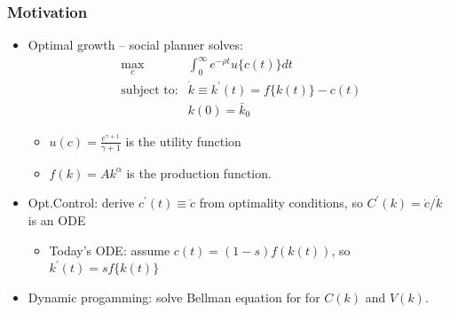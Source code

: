 \documentclass[bigger,handout]{beamer}
\begin{document}
 
 
\begin{frame}%
  
\frametitle{Motivation}

\begin{itemize}
\item Optimal growth -- social planner solves:%
\begin{equation*}
\begin{array}{rc}
\max_{c} & \int_{0}^{\infty }e^{-\rho t}u\{c(t)\}dt \\ 
\text{subject to:} & \dot{k}\equiv k^{\prime }(t)=f\{k(t)\}-c(t) \\ 
& k(0)=\bar{k}_{0}%
\end{array}%
\end{equation*}

\begin{itemize}
\item $u(c)=\frac{c^{\gamma +1}}{\gamma +1}$ is the utility function

\item $f(k)=Ak^{\alpha }$ is the production function.
\end{itemize}

\item Opt.Control: derive $c^{\prime }(t)\equiv \dot{c}$ from optimality
conditions,\newline
so $C^{\prime }\left( k\right) =\dot{c}/\dot{k}$ is an ODE

\begin{itemize}
\item Today's ODE: assume $c\left( t\right) =\left( 1-s\right) f(k\left(
t\right)) $, so $k^{\prime }(t)=sf\{k(t)\}$
\end{itemize}

\item Dynamic progamming: solve Bellman equation \newline
for for $C\left( k\right) $ and $V\left( k\right) $.
\end{itemize}

  
 
\end{frame}%
  
 
 
\end{document}
